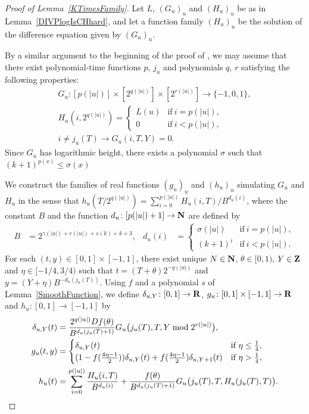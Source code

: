 \begin{proof}[Proof of Lemma~\ref{KTimesFamily}]
Let $L$, $(G_u)_u$ and $(H_u)_u$ be as in Lemma~\ref{DIVPlogIsCHhard},
and let a function family $(H_u)_u$ be the solution of the difference equation given by $(G_u)_u$.

By a similar argument to the beginning of the proof of \cite[Lemma 4.1]{kawamura2010lipschitz},
we may assume that there exist polynomial-time functions $p$, $j_u$
and polynomials $q$, $r$ satisfying the following properties:
\begin{gather}
 G_u \colon [p(|u|)] \times [2^{q(|u|)}] \times [2^{r(|u|)}] \to \{-1, 0, 1\},
 \\
 H_u(i, 2^{q(|u|)}) = \begin{cases}
		       L(u) & \text{if} \ i=p(|u|), \\
		       0 & \text{if} \ i<p(|u|), 
		      \end{cases}
 \\
 i \not = j_u(T)  \to G_u(i, T, Y) = 0.
\end{gather}
Since $G_u$ has logarithmic height,
there exists a polynomial $\sigma$ such that $(k+1)^{p(x)} \le \sigma(x)$


We construct the families of real functions $(g_u)_u$ and $(h_u)_u$ simulating $G _u$ and $H _u$ 
in the sense that $h_u(T/2^{q(|u|)}) = \sum^{p(|u|)}_{i = 0}H_u(i, T)/B^{d_u(i)}$, 
where the constant $B$ and the function $d_u \colon [p(|u|)+1] \to \mathbf N$ are 
defined by
  \begin{align}
   B &= 2^{\gamma(|u|) + r(|u|) + s(k) + k + 3}, 
   &
   d_u(i) &= 
   \begin{cases}
    \sigma(|u|) & \text{if} \ i=p(|u|), 
    \\
    (k+1)^i & \text{if} \ i<p(|u|).
   \end{cases}
  \end{align}
For each $(t, y) \in [0,1] \times [-1, 1]$,
there exist unique $N \in \mathbf N$, $\theta \in [0,1)$, $Y \in \mathbf Z$ and $\eta \in [-1/4, 3/4)$
such that $t = (T + \theta)2^{-q(|u|)}$ and $y = (Y + \eta)B^{-d_u(j_u(T))}$.
Using $f$ and a polynomial $s$ of Lemma~\ref{SmoothFunction},
we define 
$\delta_{u,Y} \colon [0,1] \to \mathbf R$,
$
g _u \colon [0, 1] \times [-1, 1] \to \mathbf R
$ and $
h _u \colon [0, 1] \to [-1, 1]
$ by
  \begin{align}
    \label{eq:delta}
   \delta_{u, Y} (t) &= \frac{2^{q(|u|)} D f(\theta)}{B^{d_u(j_u(T)+1)}} 
   G_u \bigl( j_u(T), T, Y \bmod 2^{r(|u|)} \bigr),
   \\
  \label{eq:gu}
  g_u(t,y) 
  &= \begin{cases}
     \delta_{u, Y}(t)
     & \text{if} \ \eta \le \frac 1 4, 
     \\
     ( 1-f ( \frac{4\eta-1}{2})) \delta_{u, Y}(t)
     + f ( \frac{4\eta-1}{2}) \delta_{u,Y+1}(t)
     & \text{if} \ \eta > \frac 1 4,
    \end{cases}
   \\
  h_u(t) 
   &= \sum^{p(|u|)}_{i=0} \frac{H_u(i, T)}{B^{d_u(i)}}  
  + \frac{f(\theta)}{B^{d_u(j_u(T)+1)}} G_u \bigl( j_u(T), T, H_u(j_u(T), T) \bigr) .
  \label{eq:hu}
  \end{align}


\end{proof}
